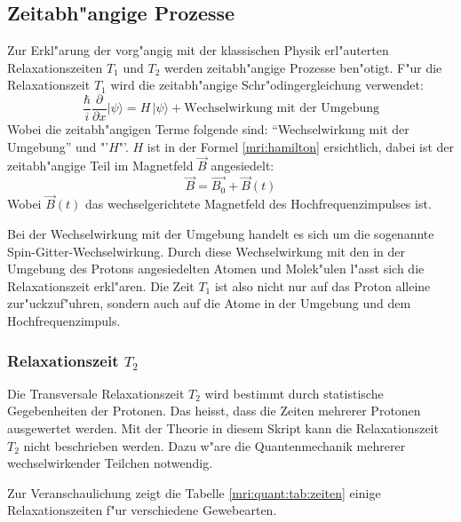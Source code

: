 \subsection{Zeitabh"angige Prozesse}
Zur Erkl"arung der vorg"angig mit der klassischen Physik erl"auterten Relaxationszeiten $T_1$ und $T_2$ werden zeitabh"angige Prozesse ben"otigt. F"ur die Relaxationszeit $T_1$ wird die zeitabh"angige Schr"odingergleichung verwendet:
\begin{equation}
\frac{\hbar}{i} \frac{\partial}{\partial x} |\psi\rangle = H\,|\psi\rangle + \text{Wechselwirkung mit der Umgebung}
\end{equation}
Wobei die zeitabh"angigen Terme folgende sind: "`Wechselwirkung mit der Umgebung"' und "'$H$"'. 
$H$ ist in der Formel \ref{mri:hamilton} ersichtlich, dabei ist der zeitabh"angige Teil im Magnetfeld $\vec{B}$ angesiedelt:
\begin{equation}
\vec{B} = \vec{B_0} + \vec{B}(t)
\end{equation}
Wobei $\vec{B}(t)$ das wechselgerichtete Magnetfeld des Hochfrequenzimpulses ist.

Bei der Wechselwirkung mit der Umgebung handelt es sich um die sogenannte Spin-Gitter-Wechselwirkung. Durch diese Wechselwirkung mit den in der Umgebung des Protons angesiedelten Atomen und Molek"ulen l"asst sich die Relaxationszeit erkl"aren. Die Zeit $T_1$ ist also nicht nur auf das Proton alleine zur"uckzuf"uhren, sondern auch auf die Atome in der Umgebung und dem Hochfrequenzimpuls.

\subsubsection{Relaxationszeit $T_2$}

Die Transversale  Relaxationszeit $T_2$ wird bestimmt durch statistische Gegebenheiten der Protonen. Das heisst, dass die Zeiten mehrerer Protonen ausgewertet werden. Mit der Theorie in diesem Skript kann die Relaxationszeit $T_2$ nicht beschrieben werden. Dazu w"are die Quantenmechanik mehrerer wechselwirkender Teilchen notwendig. 

Zur Veranschaulichung zeigt die Tabelle \ref{mri:quant:tab:zeiten} einige Relaxationszeiten f"ur verschiedene Gewebearten.

